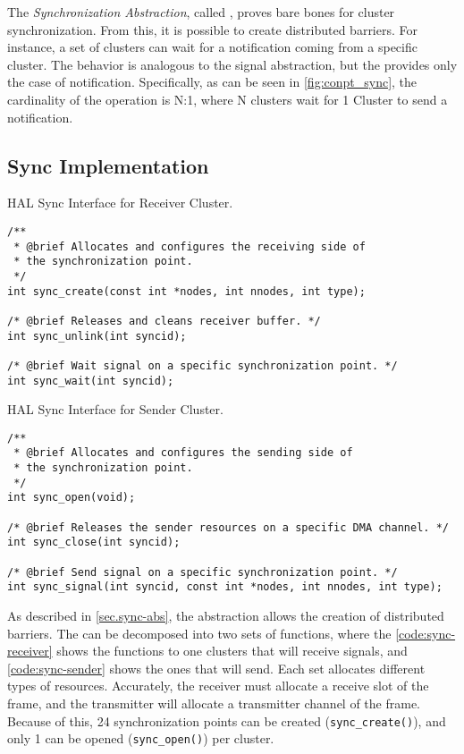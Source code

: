 
			The \textit{Synchronization Abstraction}, called \sync, proves bare bones
			for cluster synchronization.
			From this, it is possible to create distributed barriers.
			For instance, a set of clusters can wait for a notification coming
			from a specific cluster.
			The behavior is analogous to the \posix signal abstraction, but the \sync
			provides only the case of notification.
			Specifically, as can be seen in \autoref{fig:conpt_sync}, the
			cardinality of the operation is N:1, where N clusters wait for 1 Cluster
			to send a notification.

			\subsection*{Sync Implementation}

\begin{listing}[!tb]
\caption{HAL Sync Interface for Receiver Cluster.}
\label{code:sync-receiver}
\begin{verbatim}
/**
 * @brief Allocates and configures the receiving side of
 * the synchronization point.
 */
int sync_create(const int *nodes, int nnodes, int type);

/* @brief Releases and cleans receiver buffer. */
int sync_unlink(int syncid);

/* @brief Wait signal on a specific synchronization point. */
int sync_wait(int syncid);
\end{verbatim}
\end{listing}

\begin{listing}[!tb]
\caption{HAL Sync Interface for Sender Cluster.}
\label{code:sync-sender}
\begin{verbatim}
/**
 * @brief Allocates and configures the sending side of
 * the synchronization point.
 */
int sync_open(void);

/* @brief Releases the sender resources on a specific DMA channel. */
int sync_close(int syncid);

/* @brief Send signal on a specific synchronization point. */
int sync_signal(int syncid, const int *nodes, int nnodes, int type);
\end{verbatim}
\end{listing}

				As described in \autoref{sec.sync-abs}, the \sync abstraction allows the
				creation of distributed barriers.
				The \sync can be decomposed into two sets of functions, where the
				\autoref{code:sync-receiver} shows the functions to one clusters
				that will receive signals, and \autoref{code:sync-sender} shows the
				ones that will send.
				Each set allocates different types of resources.
				Accurately, the receiver must allocate a receive slot of the frame,
				and the transmitter will allocate a transmitter channel of the frame.
				Because of this, 24 synchronization points can be created (\texttt{sync\_create()}),
				and only 1 can be opened (\texttt{sync\_open()}) per cluster.


